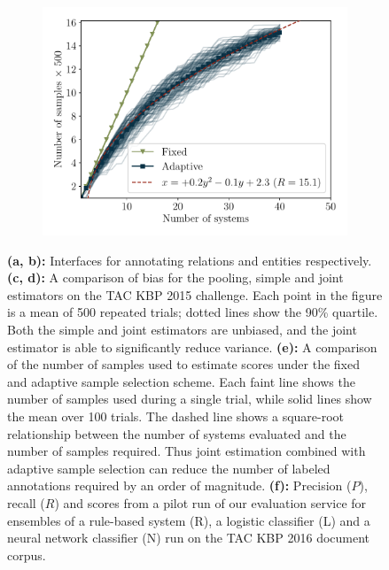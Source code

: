 \begin{figure}
  \begin{subfigure}{0.49\textwidth}
    \centering
    \includegraphics[width=\textwidth]{figures/simulation/simulation-n}
    \caption{}
  \end{subfigure}
  \hfill
  \begin{subfigure}{0.49\textwidth}
    \centering
    
    \vfill
    \caption{\label{fig:evaluation-results}}
  \end{subfigure}

  \caption{\label{fig:simulation}
  \textbf{(a, b):} Interfaces for annotating relations and entities respectively.
  \textbf{(c, d):}
  A comparison of bias for the pooling, simple and joint estimators on the TAC KBP 2015 challenge.
  Each point in the figure is a mean of 500 repeated trials; dotted lines show the 90\% quartile.
  Both the simple and joint estimators are unbiased, and the joint estimator is able to significantly reduce variance.
  \textbf{(e):} 
  A comparison of the number of samples used to estimate scores under the fixed and adaptive sample selection scheme.
  Each faint line shows the number of samples used during a single trial, while solid lines show the mean over 100 trials.
  The dashed line shows a square-root relationship between the number of systems evaluated and the number of samples required.
  Thus joint estimation combined with adaptive sample selection can reduce the number of labeled annotations required by an order of magnitude.
  \textbf{(f):} 
Precision ($P$), recall ($R$) and \fone{} scores from a pilot run of our evaluation service for ensembles of a rule-based system (R), a logistic classifier (L) and a neural network classifier (N) run on the TAC KBP 2016 document corpus. 
  }
\end{figure}


